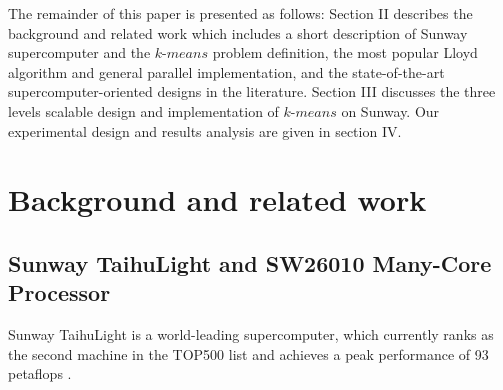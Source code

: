 \begin{itemize}
\end{itemize}
 
The remainder of this paper is presented as follows: Section II describes the background and related work which includes a short description of Sunway supercomputer and the $k$-$means$ problem definition, the most popular Lloyd algorithm and general parallel implementation, and the state-of-the-art supercomputer-oriented designs in the literature. Section III discusses the three levels scalable design and implementation of $k$-$means$ on Sunway. Our experimental design and results analysis are given in section IV. 




\section{Background and related work}

\subsection{Sunway TaihuLight and SW26010 Many-Core Processor}
Sunway TaihuLight is a world-leading supercomputer, which currently ranks as the second machine in the TOP500 list\cite{top500} and achieves a peak performance of 93 petaflops \cite{fu2016sunway}. 

